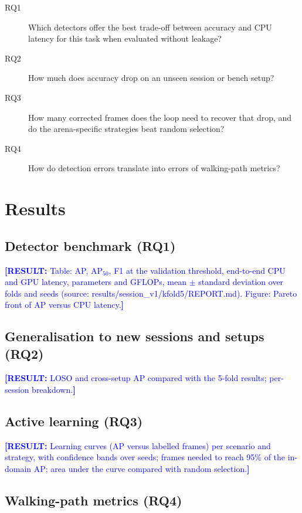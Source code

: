 \documentclass[pdflatex,sn-basic,Numbered]{sn-jnl}
\newcommand{\result}[1]{\textcolor{blue}{\textbf{[RESULT:} #1\textbf{]}}}
\theoremstyle{thmstyleone}%
\begin{document}
\begin{description}
\item[RQ1] Which detectors offer the best trade-off between accuracy and CPU latency for this task when evaluated without leakage?
\item[RQ2] How much does accuracy drop on an unseen session or bench setup?
\item[RQ3] How many corrected frames does the loop need to recover that drop, and do the arena-specific strategies beat random selection?
\item[RQ4] How do detection errors translate into errors of walking-path metrics?
\end{description}

\section{Results}\label{sec:results}

\subsection{Detector benchmark (RQ1)}

\result{Table: AP, AP$_{50}$, F1 at the validation threshold, end-to-end CPU and GPU latency, parameters and GFLOPs, mean $\pm$ standard deviation over folds and seeds (source: results/session\_v1/kfold5/REPORT.md). Figure: Pareto front of AP versus CPU latency.}

\subsection{Generalisation to new sessions and setups (RQ2)}

\result{LOSO and cross-setup AP compared with the 5-fold results; per-session breakdown.}

\subsection{Active learning (RQ3)}

\result{Learning curves (AP versus labelled frames) per scenario and strategy, with confidence bands over seeds; frames needed to reach 95\% of the in-domain AP; area under the curve compared with random selection.}

\subsection{Walking-path metrics (RQ4)}
\end{document}
